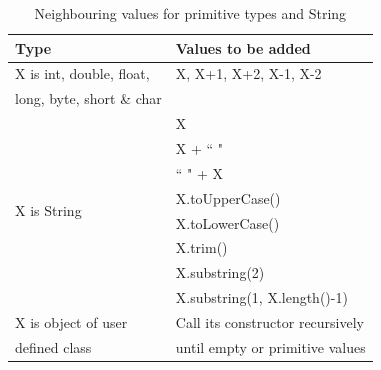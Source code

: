 \documentclass[conference]{IEEEtran}
\begin{document}


\begin{table}[ht]
\caption{Neighbouring values for primitive types and String} %
\centering %
\begin{tabular}{| l | l |} %
\hline\hline %
Type & Values to be added\\ [0.5ex] %
\hline %
\multirow{1}{*}{X is int, double, float, } & X,  X+1, X+2, X-1, X-2 \\ %
\multirow{1}{*}{long, byte, short \& char} &  \\ 

\hline
\multirow{8}{*}{X is String} & X\\ %

& X + ``  "\\ %
& ``  " + X \\ %
& X.toUpperCase() \\
& X.toLowerCase() \\
& X.trim() \\
& X.substring(2) \\
& X.substring(1, X.length()-1) \\
\hline
\multirow{1}{*}{X is object of user} & Call its constructor recursively \\ %
\multirow{1}{*}{defined class} & until empty or primitive values \\[1ex]
\hline
\hline %
\end{tabular}
\bigskip
\label{table:addvalues} %
\end{table}
\end{document}
